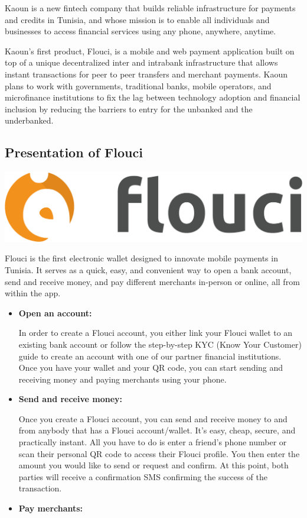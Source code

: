 \begin{spacing}{1.2}
Kaoun is a new fintech company that builds reliable infrastructure for payments and credits in Tunisia, and whose mission is to enable all individuals and businesses to access financial services using any phone, anywhere, anytime.

Kaoun's first product, Flouci, is a mobile and web payment application built on top of a unique decentralized inter and intrabank infrastructure that allows instant transactions for peer to peer transfers and merchant payments. Kaoun plans to work with governments, traditional banks, mobile operators, and microfinance institutions to fix the lag between technology adoption and financial inclusion by reducing the barriers to entry for the unbanked and the underbanked.








\subsection{Presentation of Flouci}
\begin{center}
	\includegraphics[scale=0.2]{floucilogo.png}
\end{center}
Flouci is the first electronic wallet designed to innovate mobile payments in Tunisia. It serves as a quick, easy, and convenient way to open a bank account, send and receive money, and pay different merchants in-person or online, all from within the app.
\begin{itemize}
  \item \textbf{Open an account:}

  In order to create a Flouci account, you either link your Flouci wallet to an existing bank account or follow the step-by-step KYC (Know Your Customer) guide to create an account with one of our partner financial institutions. Once you have your wallet and your QR code, you can start sending and receiving money and paying merchants using your phone.

  \item \textbf{Send and receive money:}

  Once you create a Flouci account, you can send and receive money to and from anybody that has a Flouci account/wallet. It's easy, cheap, secure, and practically instant. All you have to do is enter a friend's phone number or scan their personal QR code to access their Flouci profile. You then enter the amount you would like to send or request and confirm. At this point, both parties will receive a confirmation SMS confirming the success of the transaction.
  \item \textbf{Pay merchants:}


\end{itemize}
\end{spacing}
